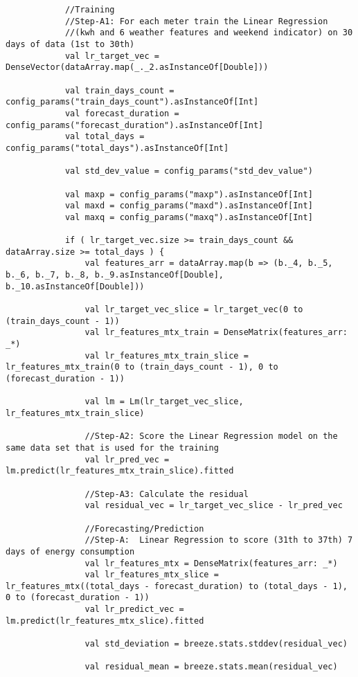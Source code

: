 \documentclass[12pt]{article}
\begin{document}
\begin{lstlisting}
       		//Training
       		//Step-A1: For each meter train the Linear Regression
       		//(kwh and 6 weather features and weekend indicator) on 30 days of data (1st to 30th)
       		val lr_target_vec = DenseVector(dataArray.map(_._2.asInstanceOf[Double]))
    
       		val train_days_count = config_params("train_days_count").asInstanceOf[Int]
       		val forecast_duration = config_params("forecast_duration").asInstanceOf[Int]
       		val total_days = config_params("total_days").asInstanceOf[Int]
    
       		val std_dev_value = config_params("std_dev_value")
    
       		val maxp = config_params("maxp").asInstanceOf[Int]
       		val maxd = config_params("maxd").asInstanceOf[Int]
       		val maxq = config_params("maxq").asInstanceOf[Int]
    
       		if ( lr_target_vec.size >= train_days_count && dataArray.size >= total_days ) {			
       			val features_arr = dataArray.map(b => (b._4, b._5, b._6, b._7, b._8, b._9.asInstanceOf[Double], b._10.asInstanceOf[Double]))
    
       			val lr_target_vec_slice = lr_target_vec(0 to (train_days_count - 1))
       			val lr_features_mtx_train = DenseMatrix(features_arr: _*)
       			val lr_features_mtx_train_slice = lr_features_mtx_train(0 to (train_days_count - 1), 0 to (forecast_duration - 1))
    
       			val lm = Lm(lr_target_vec_slice, lr_features_mtx_train_slice)
    
       			//Step-A2: Score the Linear Regression model on the same data set that is used for the training
       			val lr_pred_vec = lm.predict(lr_features_mtx_train_slice).fitted
    
       			//Step-A3: Calculate the residual
       			val residual_vec = lr_target_vec_slice - lr_pred_vec
    
       			//Forecasting/Prediction
       			//Step-A:  Linear Regression to score (31th to 37th) 7 days of energy consumption
       			val lr_features_mtx = DenseMatrix(features_arr: _*)
       			val lr_features_mtx_slice = lr_features_mtx((total_days - forecast_duration) to (total_days - 1), 0 to (forecast_duration - 1))
       			val lr_predict_vec = lm.predict(lr_features_mtx_slice).fitted
    
       			val std_deviation = breeze.stats.stddev(residual_vec)
    
       			val residual_mean = breeze.stats.mean(residual_vec)
    

\end{lstlisting}
\end{document}
